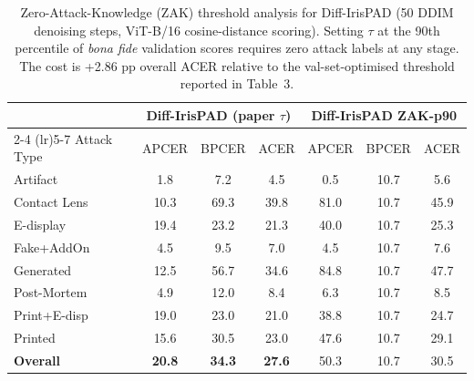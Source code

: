 \begin{table}[t]
\centering
\caption{Zero-Attack-Knowledge (ZAK) threshold analysis for Diff-IrisPAD (50 DDIM denoising steps, ViT-B/16 cosine-distance scoring). Setting $\tau$ at the 90th percentile of \emph{bona fide} validation scores requires zero attack labels at any stage. The cost is +2.86 pp overall ACER relative to the val-set-optimised threshold reported in Table~3.}
\label{tab:zak_ijcb}
\setlength{\tabcolsep}{4pt}
\small
\begin{tabular}{l ccc ccc}
\toprule
& \multicolumn{3}{c}{\textbf{Diff-IrisPAD (paper $\tau$)}} & \multicolumn{3}{c}{\textbf{Diff-IrisPAD ZAK-p90}} \\
\cmidrule(lr){2-4} \cmidrule(lr){5-7}
Attack Type & APCER & BPCER & ACER & APCER & BPCER & ACER \\ \midrule
Artifact & 1.8 & 7.2 & 4.5 & 0.5 & 10.7 & 5.6 \\
Contact Lens & 10.3 & 69.3 & 39.8 & 81.0 & 10.7 & 45.9 \\
E-display & 19.4 & 23.2 & 21.3 & 40.0 & 10.7 & 25.3 \\
Fake+AddOn & 4.5 & 9.5 & 7.0 & 4.5 & 10.7 & 7.6 \\
Generated & 12.5 & 56.7 & 34.6 & 84.8 & 10.7 & 47.7 \\
Post-Mortem & 4.9 & 12.0 & 8.4 & 6.3 & 10.7 & 8.5 \\
Print+E-disp & 19.0 & 23.0 & 21.0 & 38.8 & 10.7 & 24.7 \\
Printed & 15.6 & 30.5 & 23.0 & 47.6 & 10.7 & 29.1 \\
\midrule
\textbf{Overall} & \textbf{20.8} & \textbf{34.3} & \textbf{27.6} & 50.3 & 10.7 & 30.5 \\
\bottomrule
\end{tabular}
\end{table}